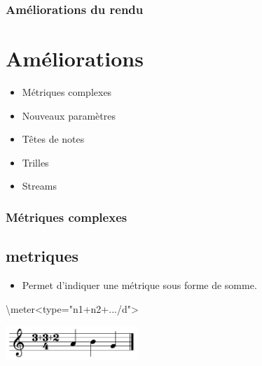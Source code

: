 \documentclass[12pt]{beamer}
\newenvironment{code}
  {\fontfamily{prc}\selectfont}{}
\begin{document}
    \begin{frame}
    \frametitle{Améliorations du rendu}
    \section{Améliorations}
    
    \large
    
    \begin{itemize}
      \item Métriques complexes
      \item Nouveaux paramètres
      \item Têtes de notes
      \item Trilles
      \item Streams
    \end{itemize}
    
    \end{frame}

    \begin{frame}
    \frametitle{Métriques complexes}
    \subsection{metriques}
    
    \begin{itemize}
    \item Permet d’indiquer une métrique sous forme de somme.
    \end{itemize}
    
    \begin{center}
    \begin{code} \textbackslash{}meter\textless{}type="n1+n2+.../d"\textgreater{} \end{code}
    
    \vspace{5mm}
    
    \includegraphics[width=5cm]{img/partitions/complexMeter.pdf}
    \end{center}
    
    \end{frame}
    
\end{document}
